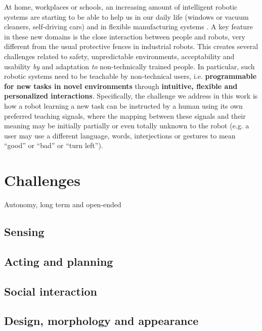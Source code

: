 At home, workplaces or schools, an increasing amount of intelligent robotic systems are starting to be able to help us in our daily life (windows or vacuum cleaners, self-driving cars) \cite{gates2007robot} and in flexible manufacturing systems \cite{baxter}. A key feature in these new domains is the close interaction between people and robots, very different from the usual protective fences in industrial robots. This creates several challenges related to safety, unpredictable environments, acceptability and usability \textit{by} and adaptation \textit{to} non-technically trained people. 
%
In particular, such robotic systems need to be teachable by non-technical users, i.e. \textbf{programmable for new tasks in novel environments} through \textbf{intuitive, flexible and personalized interactions}. Specifically, the challenge we address in this work is how a robot learning a new task can be instructed by a human using its own preferred teaching signals, where the mapping between these signals and their meaning may be initially partially or even totally unknown to the robot (e.g. a user may use a different language, words, interjections or gestures to mean ``good'' or ``bad'' or ``turn left''). 


\section{Challenges}

Autonomy, long term and open-ended

\subsection{Sensing}

\subsection{Acting and planning}

\subsection{Social interaction}

\subsection{Design, morphology and appearance}

